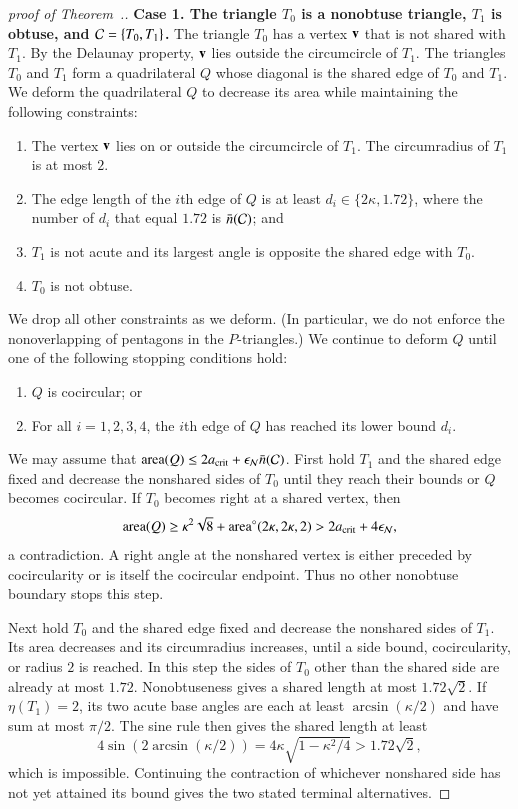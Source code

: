 \begin{proof}[proof of Theorem~.]
{\bf Case 1. The triangle $T_0$ is a nonobtuse triangle, $T_1$ is obtuse, and
  $\mathcal C=\{T_0,T_1\}$.}  The triangle $T_0$ has a vertex ${\mathbf v}$ that is
not shared with $T_1$.  By the Delaunay property, ${\mathbf v}$ lies outside
the circumcircle of $T_1$.  The triangles $T_0$ and $T_1$ form a
quadrilateral $Q$ whose diagonal is the shared edge of $T_0$ and
$T_1$.  We deform the quadrilateral $Q$ to decrease its area while
maintaining the following constraints:
\begin{enumerate}
\item The vertex ${\mathbf v}$ lies on or outside the circumcircle of
  $T_1$. The circumradius of $T_1$ is at most $2$.
\item The edge length of the $i$th edge of $Q$ is at least
  $d_i\in\{2\kappa,1.72\}$,
where  the number of $d_i$ that equal $1.72$ is $\bar n(\mathcal C)$; and
\item $T_1$ is not acute and its largest angle is opposite
  the shared edge with $T_0$.
\item $T_0$ is not obtuse.
\end{enumerate}
We drop all other constraints as we deform. (In particular, we do not
enforce the nonoverlapping of pentagons in the $P$-triangles.)  We
continue to deform $Q$ until one of the following stopping conditions hold:
\begin{enumerate}
\item $Q$ is cocircular; or
\item For all $i=1,2,3,4$, the $i$th edge of $Q$ has reached its lower
  bound $d_i$.
\end{enumerate}
We may assume that ${\operatorname{area}}(Q)\le2a_\text{crit}+\epsilon_{\mathcal N}\bar n(\mathcal C)$. First hold $T_1$ and the shared edge fixed and decrease the nonshared sides of $T_0$ until they reach their bounds or $Q$ becomes cocircular. If $T_0$ becomes right at a shared vertex, then
\[
{\operatorname{area}}(Q)\ge\kappa^2\sqrt8+{\operatorname{area}}^\circ(2\kappa,2\kappa,2)>2a_\text{crit}+4\epsilon_{\mathcal N},
\]
a contradiction. A right angle at the nonshared vertex is either preceded by cocircularity or is itself the cocircular endpoint. Thus no other nonobtuse boundary stops this step.

Next hold $T_0$ and the shared edge fixed and decrease the nonshared sides of $T_1$. Its area decreases and its circumradius increases, until a side bound, cocircularity, or radius $2$ is reached. In this step the sides of $T_0$ other than the shared side are already at most $1.72$. Nonobtuseness gives a shared length at most $1.72\sqrt2$. If $\eta(T_1)=2$, its two acute base angles are each at least $\arcsin(\kappa/2)$ and have sum at most $\pi/2$. The sine rule then gives the shared length at least
\[
4\sin(2\arcsin(\kappa/2))=4\kappa\sqrt{1-\kappa^2/4}>1.72\sqrt2,
\]
which is impossible. Continuing the contraction of whichever nonshared side has not yet attained its bound gives the two stated terminal alternatives.


\end{proof}
